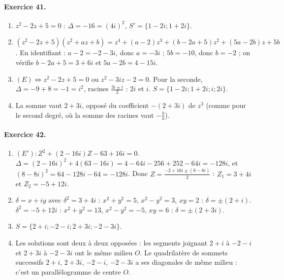 \begin{corrige}
\paragraph{Exercice 41.}
\begin{enumerate}
\item $z^2 - 2z + 5 = 0$ : $\Delta = -16 = (4i)^2$, $S' = \{1 - 2i ; 1 + 2i\}$.
\item $(z^2 - 2z + 5)(z^2 + az + b) = z^4 + (a - 2)z^3 + (b - 2a + 5)z^2 + (5a - 2b)z + 5b$.
      En identifiant : $a - 2 = -2 - 3i$, donc $a = -3i$ ; $5b = -10$, donc $b = -2$ ;
      on v\'erifie $b - 2a + 5 = 3 + 6i$ et $5a - 2b = 4 - 15i$.
\item $(E) \iff z^2 - 2z + 5 = 0$ ou $z^2 - 3iz - 2 = 0$. Pour la seconde, $\Delta = -9 + 8 = -1 = i^2$, racines $\frac{3i \pm i}{2}$ : $2i$ et $i$.
      $S = \{1 - 2i ; 1 + 2i ; i ; 2i\}$.
\item La somme vaut $2 + 3i$, oppos\'e du coefficient $-(2 + 3i)$ de $z^3$ (comme pour le second degr\'e, o\`u la somme des racines vaut $-\frac{b}{a}$).
\end{enumerate}

\paragraph{Exercice 42.}
\begin{enumerate}
\item $(E') : Z^2 + (2 - 16i)Z - 63 + 16i = 0$. $\Delta = (2 - 16i)^2 + 4(63 - 16i) = 4 - 64i - 256 + 252 - 64i = -128i$,
      et $(8 - 8i)^2 = 64 - 128i - 64 = -128i$. Donc $Z = \frac{-2 + 16i \pm (8 - 8i)}{2}$ : $Z_1 = 3 + 4i$ et $Z_2 = -5 + 12i$.
\item $\delta = x + iy$ avec $\delta^2 = 3 + 4i$ : $x^2 + y^2 = 5$, $x^2 - y^2 = 3$, $xy = 2$ : $\delta = \pm(2 + i)$.
      $\delta^2 = -5 + 12i$ : $x^2 + y^2 = 13$, $x^2 - y^2 = -5$, $xy = 6$ : $\delta = \pm(2 + 3i)$.
\item $S = \{2 + i ; -2 - i ; 2 + 3i ; -2 - 3i\}$.
\item Les solutions sont deux \`a deux oppos\'ees : les segments joignant $2 + i$ \`a $-2 - i$ et $2 + 3i$ \`a $-2 - 3i$ ont le m\^eme milieu $O$.
      Le quadrilat\`ere de sommets successifs $2 + i$, $2 + 3i$, $-2 - i$, $-2 - 3i$ a ses diagonales de m\^eme milieu : c'est un parall\'elogramme de centre $O$.
\end{enumerate}


\end{corrige}
